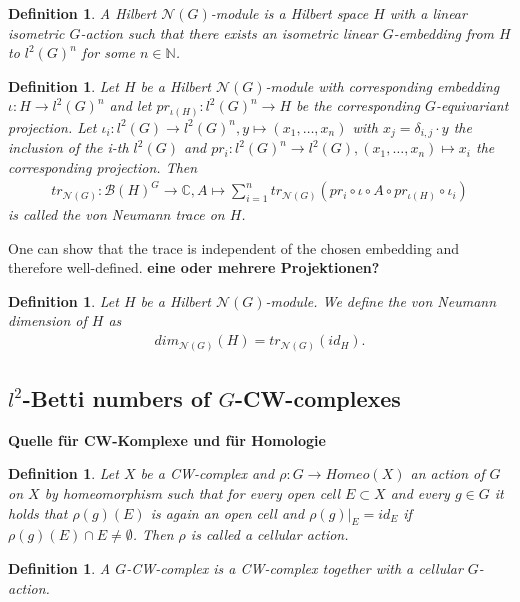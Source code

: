 \documentclass[12pt,a4paper]{scrartcl}
\newtheorem{Definition}[Theorem]{Definition}
\numberwithin{equation}{section}
\newcommand{\C}{\mathbb{C}} %
\newcommand{\N}{\mathbb{N}} %
\newcommand{\2}{\mathbb{Z} / 2 \mathbb{Z}}
\newcommand{\1}{\overline{1}}
\newcommand{\0}{\overline{0}}
\begin{document}
\begin{Definition}
	A Hilbert $\mathcal{N}(G)$-module is a Hilbert space $H$ with a linear isometric $G$-action such that there exists an isometric linear $G$-embedding from $H$ to $l^2(G)^n$ for some $n \in \N$.
\end{Definition}
\begin{Definition}
	Let $H$ be a Hilbert $\mathcal{N}(G)$-module with corresponding embedding $\iota: H \to l^2(G)^n$ and let $pr_{\iota(H)}: l^2(G)^n \to H$ be the corresponding $G$-equivariant projection. Let $\iota_i: l^2(G) \to l^2(G)^n, y \mapsto (x_1, \ldots, x_n)$ with $x_j = \delta_{i,j} \cdot y$ the inclusion of the i-th $l^2(G)$ and $pr_i: l^2(G)^n \to l^2(G), (x_1, \ldots, x_n) \mapsto x_i$ the corresponding projection. Then 
	\begin{align*}
		tr_{\mathcal{N}(G)}: \mathcal{B}(H)^G \to \C, A \mapsto \sum_{i = 1}^{n} tr_{\mathcal{N}(G)}(pr_i \circ \iota \circ A \circ pr_{\iota(H)} \circ \iota_i)
	\end{align*}
	is called the von Neumann trace on $H$.
\end{Definition}
One can show that the trace is independent of the chosen embedding and therefore well-defined. \textbf{eine oder mehrere Projektionen?} 
\begin{Definition}
	Let $H$ be a Hilbert $\mathcal{N}(G)$-module. We define the von Neumann dimension of $H$ as
	\begin{align*}
		dim_{\mathcal{N}(G)}(H) = tr_{\mathcal{N}(G)}(id_H).
	\end{align*}
\end{Definition}

\subsection{$l^2$-Betti numbers of $G$-CW-complexes}
\textbf{Quelle für CW-Komplexe und für Homologie}
\begin{Definition}
	Let $X$ be a CW-complex and $\rho: G \to Homeo(X)$ an action of $G$ on $X$ by homeomorphism such that for every open cell $E \subset X$ and every $g \in G$ it holds that $\rho(g)(E)$ is again an open cell and $\rho(g)|_{E} = id_E$ if $\rho(g)(E) \cap E \neq \emptyset$. Then $\rho$ is called a cellular action.
\end{Definition}

\begin{Definition}
	A $G$-CW-complex is a CW-complex together with a cellular $G$-action.
\end{Definition}
\end{document}
